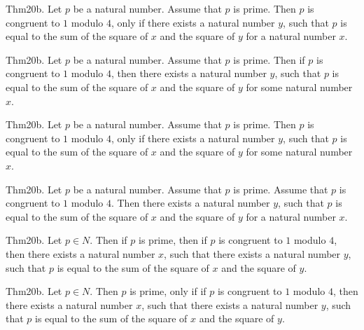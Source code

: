\documentclass{article}
\begin{document}
Thm20b. Let $p$ be a natural number. Assume that $p$ is prime. Then $p$ is congruent to $1$ modulo $4$, only if there exists a natural number $y$, such that $p$ is equal to the sum of the square of $x$ and the square of $y$ for a natural number $x$.

Thm20b. Let $p$ be a natural number. Assume that $p$ is prime. Then if $p$ is congruent to $1$ modulo $4$, then there exists a natural number $y$, such that $p$ is equal to the sum of the square of $x$ and the square of $y$ for some natural number $x$.

Thm20b. Let $p$ be a natural number. Assume that $p$ is prime. Then $p$ is congruent to $1$ modulo $4$, only if there exists a natural number $y$, such that $p$ is equal to the sum of the square of $x$ and the square of $y$ for some natural number $x$.

Thm20b. Let $p$ be a natural number. Assume that $p$ is prime. Assume that $p$ is congruent to $1$ modulo $4$. Then there exists a natural number $y$, such that $p$ is equal to the sum of the square of $x$ and the square of $y$ for a natural number $x$.

Thm20b. Let $p \in N$. Then if $p$ is prime, then if $p$ is congruent to $1$ modulo $4$, then there exists a natural number $x$, such that there exists a natural number $y$, such that $p$ is equal to the sum of the square of $x$ and the square of $y$.

Thm20b. Let $p \in N$. Then $p$ is prime, only if if $p$ is congruent to $1$ modulo $4$, then there exists a natural number $x$, such that there exists a natural number $y$, such that $p$ is equal to the sum of the square of $x$ and the square of $y$.
\end{document}

